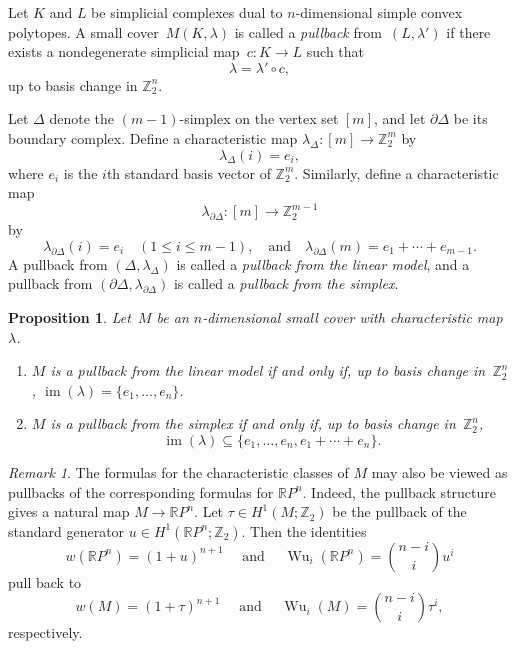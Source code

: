 \documentclass{amsart}
\newcommand{\RP}{\mathbb{R}P}
\newcommand{\Z}{\mathbb{Z}}
\DeclareMathOperator{\im}{im}
\theoremstyle{plain}
\newtheorem{proposition}[theorem]{Proposition}
\numberwithin{equation}{section}
\theoremstyle{definition}
\theoremstyle{remark}
\newtheorem{remark}[theorem]{Remark}
\begin{document}
Let $K$ and $L$ be simplicial complexes dual to $n$-dimensional simple convex polytopes.
A small cover~$M(K,\lambda)$ is called a \emph{pullback} from~$(L,\lambda')$ if there exists a nondegenerate simplicial map~$c \colon K \to L$ such that
\[
\lambda=\lambda'\circ c,
\]
up to basis change in $\Z_2^n$.

Let $\Delta$ denote the $(m-1)$-simplex on the vertex set $[m]$, and let $\partial\Delta$ be its boundary complex.
Define a characteristic map $\lambda_{\Delta} \colon [m] \to \Z_2^m$ by
\[
\lambda_{\Delta}(i) = e_i,
\]
where $e_i$ is the $i$th standard basis vector of $\Z_2^m$.
Similarly, define a characteristic map
\[
\lambda_{\partial\Delta} \colon [m] \to \Z_2^{m-1}
\]
by
\[
\lambda_{\partial\Delta}(i)=e_i \quad (1\le i\le m-1), \quad \text{and} \quad \lambda_{\partial\Delta}(m)=e_1+\cdots+e_{m-1}.
\]
A pullback from $(\Delta,\lambda_{\Delta})$ is called a \emph{pullback from the linear model}, and a pullback from $(\partial\Delta,\lambda_{\partial\Delta})$ is called a \emph{pullback from the simplex}.

\begin{proposition}\label{prop:pullbackiff}
Let~$M$ be an $n$-dimensional small cover with characteristic map~$\lambda$.
  \begin{enumerate}
    \item\label{prop:pullbackiff1} $M$ is a pullback from the linear model if and only if, up to basis change in~$\Z_2^n$, $\im(\lambda)=\{e_1,\ldots,e_n\}$.
\item\label{prop:pullbackiff2} $M$ is a pullback from the simplex if and only if, up to basis change in~$\Z_2^n$,
    $$
    \im(\lambda) \subseteq \{e_1,\ldots,e_n,e_1+\cdots+e_n\}.
    $$
  \end{enumerate}
\end{proposition}

\begin{remark}
The formulas for the characteristic classes of $M$ may also be viewed as pullbacks of the corresponding formulas for $\RP^n$. 
Indeed, the pullback structure gives a natural map $M\longrightarrow \RP^n$.
Let $\tau \in H^1(M;\Z_2)$ be the pullback of the standard generator $u\in H^1(\RP^n;\Z_2)$.
Then the identities
$$
    w(\RP^n)=(1+u)^{n+1} \quad \text{ and } \quad \operatorname{Wu}_i(\RP^n)=\binom{n-i}{i}u^i
$$
pull back to
$$
    w(M)=(1+\tau)^{n+1} \quad \text{ and } \quad \operatorname{Wu}_i(M)=\binom{n-i}{i}\tau^i,
$$
respectively.
\end{remark}
\end{document}
